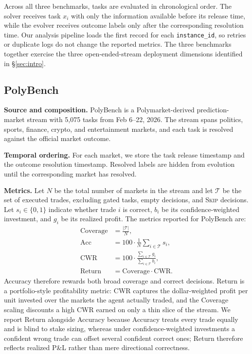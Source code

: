 \documentclass[11pt]{article}
\theoremstyle{plain}
\begin{document}
Across all three benchmarks, tasks are evaluated in chronological order. The solver receives task $x_i$ with only the information available before its release time, while the evolver receives outcome labels only after the corresponding resolution time. Our analysis pipeline loads the first record for each \texttt{instance\_id}, so retries or duplicate logs do not change the reported metrics. The three benchmarks together exercise the three open-ended-stream deployment dimensions identified in \S\ref{sec:intro}.

\subsection{PolyBench}

\noindent\textbf{Source and composition.}
PolyBench is a Polymarket-derived prediction-market stream with 5{,}075 tasks from Feb 6--22, 2026. The stream spans politics, sports, finance, crypto, and entertainment markets, and each task is resolved against the official market outcome.

\noindent\textbf{Temporal ordering.}
For each market, we store the task release timestamp and the outcome resolution timestamp. Resolved labels are hidden from evolution until the corresponding market has resolved.

\noindent\textbf{Metrics.}
Let $N$ be the total number of markets in the stream and let $\mathcal{T}$ be the set of executed trades, excluding gated tasks, empty decisions, and \textsc{Skip} decisions. Let $s_i\in\{0,1\}$ indicate whether trade $i$ is correct, $b_i$ be its confidence-weighted investment, and $g_i$ be its realized profit. The metrics reported for PolyBench are:
\begin{align*}
\mathrm{Coverage} &= \tfrac{|\mathcal{T}|}{N}, \\
\mathrm{Acc}      &= 100 \cdot \tfrac{1}{N}\textstyle\sum_{i\in\mathcal{T}} s_i, \\
\mathrm{CWR}      &= 100 \cdot \tfrac{\sum_{i\in\mathcal{T}} g_i}{\sum_{i\in\mathcal{T}} b_i}, \\
\mathrm{Return}   &= \mathrm{Coverage} \cdot \mathrm{CWR}.
\end{align*}
Accuracy therefore rewards both broad coverage and correct decisions. Return is a portfolio-style profitability metric: CWR captures the dollar-weighted profit per unit invested over the markets the agent actually traded, and the Coverage scaling discounts a high CWR earned on only a thin slice of the stream. We report Return alongside Accuracy because Accuracy treats every trade equally and is blind to stake sizing, whereas under confidence-weighted investments a confident wrong trade can offset several confident correct ones; Return therefore reflects realized P\&L rather than mere directional correctness.
\end{document}
